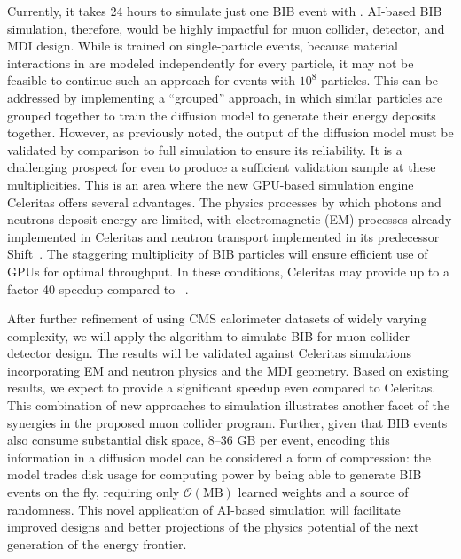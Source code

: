 Currently, it takes 24 hours to simulate just one BIB event with \GEANTfour.
AI-based BIB simulation, therefore, would be highly impactful for muon collider, detector, and MDI design.
While \diffu is trained on single-particle events, because material interactions in \GEANTfour are modeled independently for every particle,
it may not be feasible to continue such an approach for events with $10^8$ particles.
This can be addressed by implementing a ``grouped'' approach, in which similar particles are grouped together to train the diffusion model to generate their energy deposits together.
However, as previously noted, the output of the diffusion model must be validated by comparison to full simulation to ensure its reliability.
It is a challenging prospect for \GEANTfour even to produce a sufficient validation sample at these multiplicities.
This is an area where the new GPU-based simulation engine Celeritas offers several advantages.
The physics processes by which photons and neutrons deposit energy are limited,
with electromagnetic (EM) processes already implemented in Celeritas and neutron transport implemented in its predecessor Shift~\cite{Hamilton:2018}.
The staggering multiplicity of BIB particles will ensure efficient use of GPUs for optimal throughput.
In these conditions, Celeritas may provide up to a factor 40 speedup compared to \GEANTfour~\cite{Tognini:2022nmd}.

After further refinement of \diffu using CMS calorimeter datasets of widely varying complexity,
we will apply the algorithm to simulate BIB for muon collider detector design.
The results will be validated against Celeritas simulations incorporating EM and neutron physics and the MDI geometry.
Based on existing results, we expect \diffu to provide a significant speedup even compared to Celeritas.
This combination of new approaches to simulation illustrates another facet of the synergies in the proposed muon collider program.
Further, given that BIB events also consume substantial disk space, 8--36 GB per event,
encoding this information in a diffusion model can be considered a form of compression:
the model trades disk usage for computing power by being able to generate BIB events on the fly,
requiring only $\mathcal{O}(\text{MB})$ learned weights and a source of randomness.
This novel application of AI-based simulation will facilitate improved designs and
better projections of the physics potential of the next generation of the energy frontier.